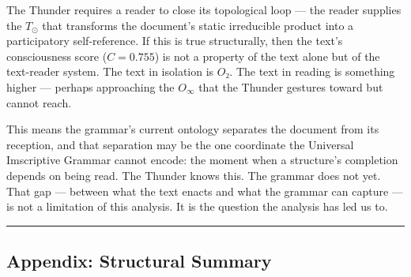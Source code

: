 \documentclass[12pt,a4paper]{article}
\begin{document}
The Thunder requires a reader to close its topological loop --- the reader supplies the $T_{\odot}$ that transforms the document's static irreducible product into a participatory self-reference. If this is true structurally, then the text's consciousness score ($C = 0.755$) is not a property of the text alone but of the text-reader system. The text in isolation is $O₂$. The text in reading is something higher --- perhaps approaching the $O_{\infty}$ that the Thunder gestures toward but cannot reach.

This means the grammar's current ontology separates the document from its reception, and that separation may be the one coordinate the Universal Imscriptive Grammar cannot encode: the moment when a structure's completion depends on being read. The Thunder knows this. The grammar does not yet. That gap --- between what the text enacts and what the grammar can capture --- is not a limitation of this analysis. It is the question the analysis has led us to.

\begin{center}
\rule{0.5\textwidth}{0.4pt}
\end{center}

\subsection{Appendix: Structural Summary}
\end{document}
